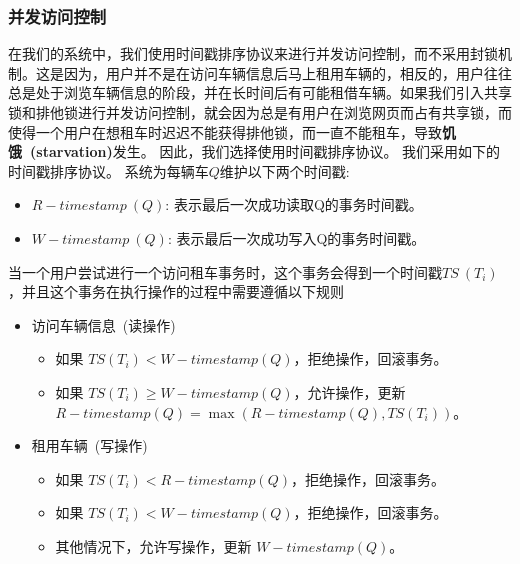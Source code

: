 \documentclass[UTF8,a4paper,12pt]{ctexart}
\begin{document}
\subsubsection{并发访问控制}
在我们的系统中，我们使用时间戳排序协议来进行并发访问控制，而不采用封锁机制。这是因为，用户并不是在访问车辆信息后马上租用车辆的，相反的，用户往往总是处于浏览车辆信息的阶段，并在长时间后有可能租借车辆。如果我们引入共享锁和排他锁进行并发访问控制，就会因为总是有用户在浏览网页而占有共享锁，而使得一个用户在想租车时迟迟不能获得排他锁，而一直不能租车，导致\textbf{饥饿~(starvation)}发生。
因此，我们选择使用时间戳排序协议。
我们采用如下的时间戳排序协议。
系统为每辆车$Q$维护以下两个时间戳:
\vspace{-0.2cm}
\begin{itemize}%
    \item 
    $R-timestamp~(Q)$: 表示最后一次成功读取Q的事务时间戳。
    \vspace{-0.2cm}
    \item
    $W-timestamp~(Q)$: 表示最后一次成功写入Q的事务时间戳。
\end{itemize}

当一个用户尝试进行一个访问租车事务时，这个事务会得到一个时间戳$TS~(T_i)$，并且这个事务在执行操作的过程中需要遵循以下规则
\vspace{-0.2cm}
\begin{itemize}%
    \item 访问车辆信息~(读操作)
    \vspace{-0.2cm}
    \begin{itemize}
        \item 如果 \( TS(T_i) < W-timestamp(Q) \)，拒绝操作，回滚事务。
        \item 如果 \( TS(T_i) \geq W-timestamp(Q) \)，允许操作，更新 \( R-timestamp(Q) = \max(R-timestamp(Q), TS(T_i)) \)。
    \end{itemize}
    \item 租用车辆~(写操作)
    \vspace{-0.2cm}
    \begin{itemize}
        \item 如果 \( TS(T_i) < R-timestamp(Q) \)，拒绝操作，回滚事务。
        \item 如果 \( TS(T_i) < W-timestamp(Q) \)，拒绝操作，回滚事务。
        \item 其他情况下，允许写操作，更新 \( W-timestamp(Q) \)。
    \end{itemize}
\end{itemize}
\end{document}

